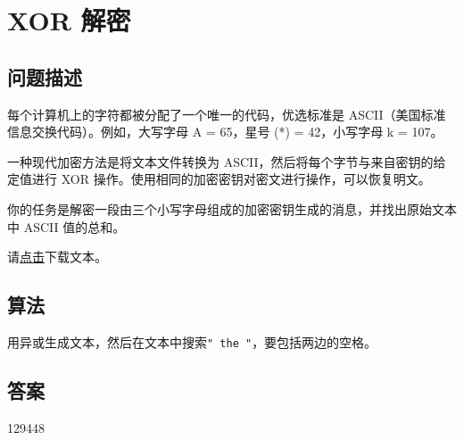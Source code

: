 \section{XOR 解密}\label{sec:problem59}
\subsection{问题描述}
\begin{tcolorbox}

	每个计算机上的字符都被分配了一个唯一的代码，优选标准是 ASCII（美国标准信息交换代码）。例如，大写字母 A = 65，星号 (*) = 42，小写字母 k = 107。

	一种现代加密方法是将文本文件转换为 ASCII，然后将每个字节与来自密钥的给定值进行 XOR 操作。使用相同的加密密钥对密文进行操作，可以恢复明文。

	你的任务是解密一段由三个小写字母组成的加密密钥生成的消息，并找出原始文本中 ASCII 值的总和。

	请\href{https://projecteuler.net/resources/documents/0059_cipher.txt}{点击}下载文本。
\end{tcolorbox}

\subsection{算法}
用异或生成文本，然后在文本中搜索\texttt{" the "}，要包括两边的空格。

\subsection{答案}
129448
